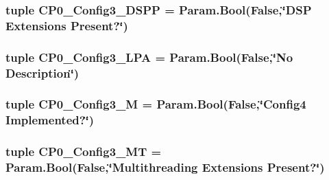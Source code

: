 \label{classMipsCPU_1_1BaseMipsCPU_ac0b6416224f47ab3b4d1e049034e1ecc}
\hypertarget{classMipsCPU_1_1BaseMipsCPU_a208bccb793ea59fdb7af54de27e24e03}{
\subsubsection[{CP0\_\-Config3\_\-DSPP}]{\setlength{\rightskip}{0pt plus 5cm}tuple {\bf CP0\_\-Config3\_\-DSPP} = Param.Bool(False,\char`\"{}DSP Extensions Present?\char`\"{})}}
\label{classMipsCPU_1_1BaseMipsCPU_a208bccb793ea59fdb7af54de27e24e03}
\hypertarget{classMipsCPU_1_1BaseMipsCPU_ae78c1c0ef2e48d4c2edab32f87c5f309}{
\subsubsection[{CP0\_\-Config3\_\-LPA}]{\setlength{\rightskip}{0pt plus 5cm}tuple {\bf CP0\_\-Config3\_\-LPA} = Param.Bool(False,\char`\"{}No Description\char`\"{})}}
\label{classMipsCPU_1_1BaseMipsCPU_ae78c1c0ef2e48d4c2edab32f87c5f309}
\hypertarget{classMipsCPU_1_1BaseMipsCPU_a727d3219d5e4f7bdcb82d72f13a64d19}{
\subsubsection[{CP0\_\-Config3\_\-M}]{\setlength{\rightskip}{0pt plus 5cm}tuple {\bf CP0\_\-Config3\_\-M} = Param.Bool(False,\char`\"{}Config4 Implemented?\char`\"{})}}
\label{classMipsCPU_1_1BaseMipsCPU_a727d3219d5e4f7bdcb82d72f13a64d19}
\hypertarget{classMipsCPU_1_1BaseMipsCPU_a7a0cc3ea582b4012a1e0029b494c6751}{
\subsubsection[{CP0\_\-Config3\_\-MT}]{\setlength{\rightskip}{0pt plus 5cm}tuple {\bf CP0\_\-Config3\_\-MT} = Param.Bool(False,\char`\"{}Multithreading Extensions Present?\char`\"{})}}
